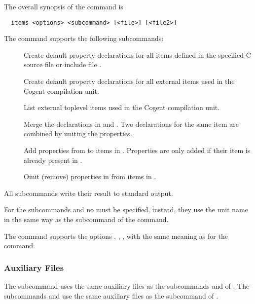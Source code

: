 The overall synopsis of the  command is
\begin{verbatim}
  items <options> <subcommand> [<file>] [<file2>]
\end{verbatim}

The  command supports the following subcommands:
\begin{description}
\item[] Create default property declarations for all items defined in the specified C source file
or include file . 

\item[] Create default property declarations for all external items used in the Cogent compilation 
unit. 

\item[] List external toplevel items used in the Cogent compilation unit. 

\item[] Merge the declarations in  and . Two declarations for the 
same item are combined by uniting the properties.

\item[] Add properties from  to items in . Properties are only added
if their item is already present in .

\item[] Omit (remove) properties in  from items in . 

\end{description}

All subcommands write their result to standard output.

For the subcommands  and  no  must be specified, instead, they use the unit name
in the same way as the subcommand  of the  command.

The  command supports the options , , ,  with the same meaning as
for the  command.

\subsubsection{Auxiliary Files}

The subcommand  uses the same auxiliary files as the subcommands  and  of .
The subcommands  and  use the same auxiliary files as the subcommand  of .

